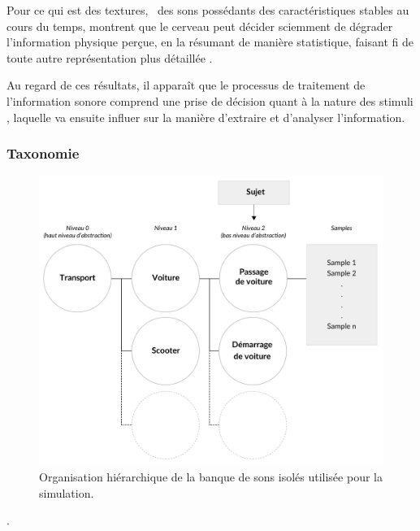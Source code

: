 \documentclass[twoside,twocolumn]{article}
\begin{document}
Pour ce qui est des textures, \ie~des sons possédants des caractéristiques stables au cours du temps, \cite{mcdermott2011sound,mcdermott2013summary} montrent que le cerveau peut décider sciemment de dégrader l'information physique perçue, en la résumant de manière statistique, faisant fi de toute autre représentation plus détaillée \cite{nelken2013ear}.

Au regard de ces résultats, il apparaît que le processus de traitement de l'information sonore comprend une prise de décision quant à la nature des stimuli \cite{nelken2013ear,mcdermott2013summary}, laquelle va ensuite influer sur la manière d'extraire et d'analyser l'information.

\subsubsection*{Taxonomie}

\begin{figure}[t]
        \myfloatalign
        \includegraphics[width=.8\linewidth]{gfx/ch_4/3}
       \caption{Organisation hiérarchique de la banque de sons isolés utilisée pour la simulation.}\label{fig:orgDb}
\end{figure}


 . 
\end{document}
